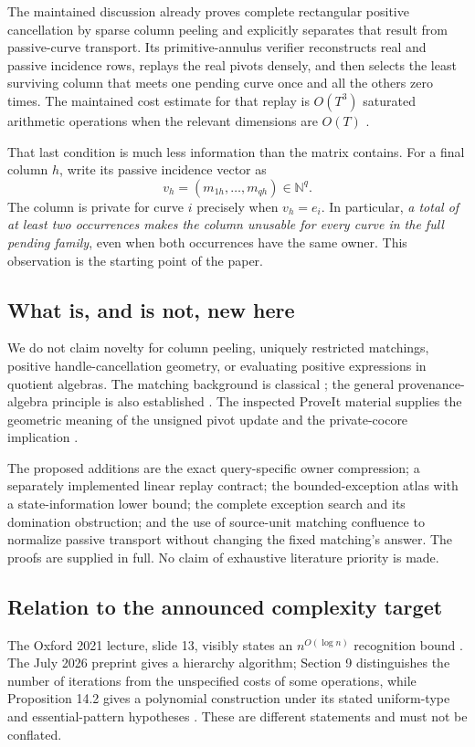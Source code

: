 \documentclass[11pt,letterpaper]{article}
\theoremstyle{definition}
\newcommand{\N}{\mathbb N}
\begin{document}
The maintained discussion already proves complete rectangular positive cancellation by sparse column peeling and explicitly separates that result from passive-curve transport. Its primitive-annulus verifier reconstructs real and passive incidence rows, replays the real pivots densely, and then selects the least surviving column that meets one pending curve once and all the others zero times. The maintained cost estimate for that replay is $O(T^3)$ saturated arithmetic operations when the relevant dimensions are $O(T)$ \cite{repoColumn,repoAnnuli,repoVerifier}.

That last condition is much less information than the matrix contains. For a final column $h$, write its passive incidence vector as
\[
 v_h=(m_{1h},\ldots,m_{qh})\in\N^q.
\]
The column is private for curve $i$ precisely when $v_h=e_i$. In particular, \emph{a total of at least two occurrences makes the column unusable for every curve in the full pending family}, even when both occurrences have the same owner. This observation is the starting point of the paper.

\subsection{What is, and is not, new here}
We do not claim novelty for column peeling, uniquely restricted matchings, positive handle-cancellation geometry, or evaluating positive expressions in quotient algebras. The matching background is classical \cite{GHL}; the general provenance-algebra principle is also established \cite{GKT}. The inspected ProveIt material supplies the geometric meaning of the unsigned pivot update and the private-cocore implication \cite{repoColumn,repoAnnuli}.

The proposed additions are the exact query-specific owner compression; a separately implemented linear replay contract; the bounded-exception atlas with a state-information lower bound; the complete exception search and its domination obstruction; and the use of source-unit matching confluence to normalize passive transport without changing the fixed matching's answer. The proofs are supplied in full. No claim of exhaustive literature priority is made.

\subsection{Relation to the announced complexity target}
The Oxford 2021 lecture, slide 13, visibly states an $n^{O(\log n)}$ recognition bound \cite{LackenbyTalk}. The July 2026 preprint gives a hierarchy algorithm; Section 9 distinguishes the number of iterations from the unspecified costs of some operations, while Proposition 14.2 gives a polynomial construction under its stated uniform-type and essential-pattern hypotheses \cite{Lackenby2026}. These are different statements and must not be conflated.
\end{document}

